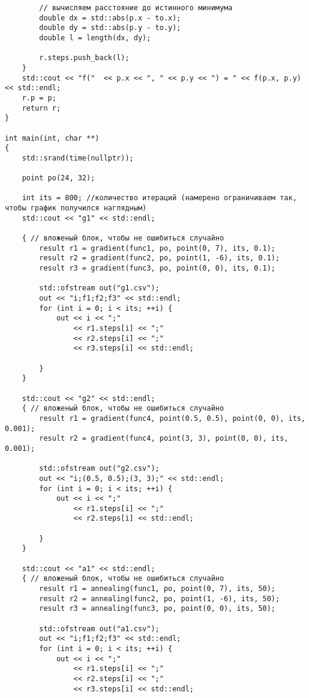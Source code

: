 \documentclass[14pt]{matmex-diploma-custom}
\begin{document}
\begin{verbatim}
        // вычисляем расстояние до истинного минимума
        double dx = std::abs(p.x - to.x);
        double dy = std::abs(p.y - to.y);
        double l = length(dx, dy);

        r.steps.push_back(l);
    }
    std::cout << "f("  << p.x << ", " << p.y << ") = " << f(p.x, p.y) << std::endl;
    r.p = p;
    return r;
}

int main(int, char **)
{
    std::srand(time(nullptr));

    point po(24, 32);

    int its = 800; //количество итераций (намерено ограничиваем так, чтобы график получился наглядным)
    std::cout << "g1" << std::endl;

    { // вложеный блок, чтобы не ошибиться случайно
        result r1 = gradient(func1, po, point(0, 7), its, 0.1);
        result r2 = gradient(func2, po, point(1, -6), its, 0.1);
        result r3 = gradient(func3, po, point(0, 0), its, 0.1);

        std::ofstream out("g1.csv");
        out << "i;f1;f2;f3" << std::endl;
        for (int i = 0; i < its; ++i) {
            out << i << ";"
                << r1.steps[i] << ";"
                << r2.steps[i] << ";"
                << r3.steps[i] << std::endl;

        }
    }

    std::cout << "g2" << std::endl;
    { // вложеный блок, чтобы не ошибиться случайно
        result r1 = gradient(func4, point(0.5, 0.5), point(0, 0), its, 0.001);
        result r2 = gradient(func4, point(3, 3), point(0, 0), its, 0.001);

        std::ofstream out("g2.csv");
        out << "i;(0.5, 0.5);(3, 3);" << std::endl;
        for (int i = 0; i < its; ++i) {
            out << i << ";"
                << r1.steps[i] << ";"
                << r2.steps[i] << std::endl;

        }
    }

    std::cout << "a1" << std::endl;
    { // вложеный блок, чтобы не ошибиться случайно
        result r1 = annealing(func1, po, point(0, 7), its, 50);
        result r2 = annealing(func2, po, point(1, -6), its, 50);
        result r3 = annealing(func3, po, point(0, 0), its, 50);

        std::ofstream out("a1.csv");
        out << "i;f1;f2;f3" << std::endl;
        for (int i = 0; i < its; ++i) {
            out << i << ";"
                << r1.steps[i] << ";"
                << r2.steps[i] << ";"
                << r3.steps[i] << std::endl;


\end{verbatim}
\end{document}

